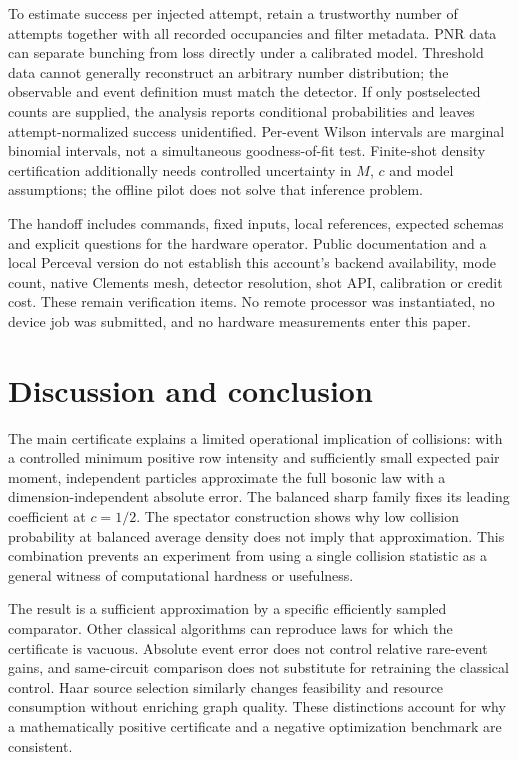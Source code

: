 \documentclass[11pt,a4paper]{article}
\theoremstyle{remark}\newtheorem{remark}[theorem]{Remark}
\begin{document}
To estimate success per injected attempt, retain a trustworthy number of attempts together with all recorded occupancies and filter metadata. PNR data can separate bunching from loss directly under a calibrated model. Threshold data cannot generally reconstruct an arbitrary number distribution; the observable and event definition must match the detector. If only postselected counts are supplied, the analysis reports conditional probabilities and leaves attempt-normalized success unidentified. Per-event Wilson intervals are marginal binomial intervals, not a simultaneous goodness-of-fit test. Finite-shot density certification additionally needs controlled uncertainty in $M$, $c$ and model assumptions; the offline pilot does not solve that inference problem.

The handoff includes commands, fixed inputs, local references, expected schemas and explicit questions for the hardware operator. Public documentation and a local Perceval version do not establish this account's backend availability, mode count, native Clements mesh, detector resolution, shot API, calibration or credit cost. These remain verification items. No remote processor was instantiated, no device job was submitted, and no hardware measurements enter this paper.

\section{Discussion and conclusion}\label{sec:discussion}
The main certificate explains a limited operational implication of collisions: with a controlled minimum positive row intensity and sufficiently small expected pair moment, independent particles approximate the full bosonic law with a dimension-independent absolute error. The balanced sharp family fixes its leading coefficient at $c=1/2$. The spectator construction shows why low collision probability at balanced average density does not imply that approximation. This combination prevents an experiment from using a single collision statistic as a general witness of computational hardness or usefulness.

The result is a sufficient approximation by a specific efficiently sampled comparator. Other classical algorithms can reproduce laws for which the certificate is vacuous. Absolute event error does not control relative rare-event gains, and same-circuit comparison does not substitute for retraining the classical control. Haar source selection similarly changes feasibility and resource consumption without enriching graph quality. These distinctions account for why a mathematically positive certificate and a negative optimization benchmark are consistent.
\end{document}
